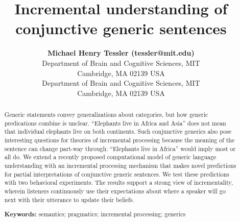 \documentclass[10pt,letterpaper]{article}
\title{Incremental understanding of conjunctive generic sentences}
\author{{\large \bf Michael Henry Tessler (tessler@mit.edu)} \\
  Department of Brain and Cognitive Sciences, MIT \\
  Cambridge, MA 02139 USA
  \AND {\large \bf Roger Levy (rplevy@mit.edu)} \\
  Department of Brain and Cognitive Sciences, MIT \\
  Cambridge, MA 02139 USA}
\begin{document}
\maketitle


\begin{abstract}


Generic statements convey generalizations about categories, but how generic predications combine is unclear.
``Elephants live in Africa and Asia'' does not mean that individual elephants live on both continents.
Such conjunctive generics %
also pose interesting questions for theories of incremental processing because the meaning of the sentence can change part-way through: ``Elephants live in Africa'' would imply most or all do. 
We extend a recently proposed computational model of generic language understanding with an incremental processing mechanism that makes novel predictions for partial interpretations of conjunctive generic sentences.
We test these predictions with two behavioral experiments. 
The results support a strong view of incrementality, wherein listeners  continuously use their expectations about where a speaker will go next with their utterance to update their beliefs.



\textbf{Keywords:} 
semantics; pragmatics; incremental processing; generics
\end{abstract}
\end{document}

